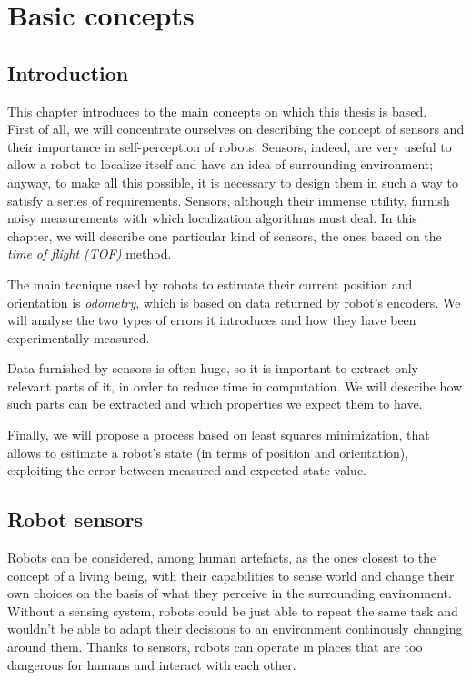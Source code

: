 \documentclass[a4paper, onecolumn]{report}
\begin{document}
\chapter{Basic concepts}
\section{Introduction}
This chapter introduces to the main concepts on which this thesis is based.  \\
First of all, we will concentrate ourselves on describing the concept of sensors and their importance in self-perception of robots. Sensors, indeed, are very useful to allow a robot to localize itself and have an idea of surrounding environment; anyway, to make all this possible, it is necessary to design them in such a way to satisfy a series of requirements. Sensors, although their immense utility, furnish noisy measurements with which localization algorithms must deal.
In this chapter, we will describe one particular kind of sensors, the ones based on the \emph{time of flight (TOF)} method.

The main tecnique used by robots to estimate their current position and orientation is \emph{odometry}, which is based on data returned by robot's encoders. We will analyse the two types of errors it introduces and how they have been experimentally measured.

Data furnished by sensors is often huge, so it is important to extract only relevant parts of it, in order to reduce time in computation. We will describe how such parts can be extracted and which properties we expect them to have.

Finally, we will propose a process based on least squares minimization, that allows to estimate a robot's state (in terms of position and orientation), exploiting the error between measured and expected state value.

\section{Robot sensors}
Robots can be considered, among human artefacts, as the ones closest to the concept of a living being, with their capabilities to sense world and change their own choices on the basis of what they perceive in the surrounding environment. Without a sensing system, robots could be just able to repeat the same task and wouldn't be able to adapt their decisions to an environment continously changing around them. Thanks to sensors, robots can operate in places that are too dangerous for humans and interact with each other. 
\end{document}
